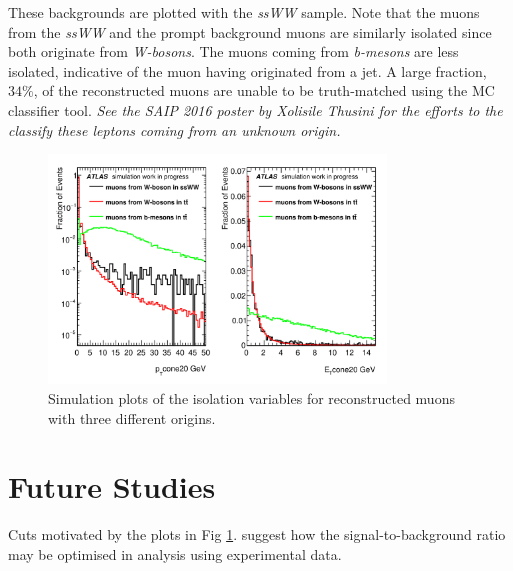 \documentclass[a4paper]{jpconf}
\begin{document}
These backgrounds are plotted with the \emph{ssWW} sample. Note that the muons from the \emph{ssWW} and the prompt background muons are similarly isolated since both originate from \emph{W-bosons}. The muons coming from \emph{b-mesons} are less isolated, indicative of the muon having originated from a jet. A large fraction, $34\%$, of the reconstructed muons are unable to be truth-matched using the MC classifier tool. \emph{See the SAIP 2016 poster by Xolisile Thusini for the efforts to the classify these leptons coming from an unknown origin.}
\begin{figure}[h]
\centering
\includegraphics[width=0.8\textwidth]{iso_vars.png}
\caption{Simulation plots of the isolation variables for reconstructed muons with three different origins.}
\label{money_plot}
\end{figure}
\section{Future Studies}
Cuts motivated by the plots in Fig \ref{money_plot}. suggest how the signal-to-background ratio may be optimised in analysis using experimental data.
\newpage
\end{document}
